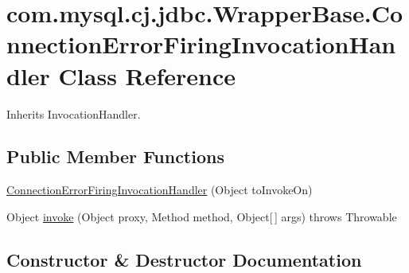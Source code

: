 \hypertarget{classcom_1_1mysql_1_1cj_1_1jdbc_1_1_wrapper_base_1_1_connection_error_firing_invocation_handler}{}\section{com.\+mysql.\+cj.\+jdbc.\+Wrapper\+Base.\+Connection\+Error\+Firing\+Invocation\+Handler Class Reference}
\label{classcom_1_1mysql_1_1cj_1_1jdbc_1_1_wrapper_base_1_1_connection_error_firing_invocation_handler}


Inherits Invocation\+Handler.

\subsection*{Public Member Functions}
\begin{DoxyCompactItemize}
\item 
\mbox{\hyperlink{classcom_1_1mysql_1_1cj_1_1jdbc_1_1_wrapper_base_1_1_connection_error_firing_invocation_handler_a62d12a26671751ab1c451c8350912337}{Connection\+Error\+Firing\+Invocation\+Handler}} (Object to\+Invoke\+On)
\item 
Object \mbox{\hyperlink{classcom_1_1mysql_1_1cj_1_1jdbc_1_1_wrapper_base_1_1_connection_error_firing_invocation_handler_a227a5a682614df2dc9e4587f89e1c9a8}{invoke}} (Object proxy, Method method, Object\mbox{[}$\,$\mbox{]} args)  throws Throwable 
\end{DoxyCompactItemize}


\subsection{Constructor \& Destructor Documentation}
\mbox{\label{classcom_1_1mysql_1_1cj_1_1jdbc_1_1_wrapper_base_1_1_connection_error_firing_invocation_handler_a62d12a26671751ab1c451c8350912337}} 
